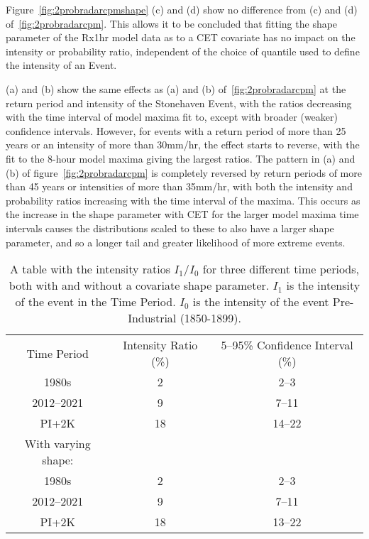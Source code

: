 Figure~\ref{fig:2probradarcpmshape} (c) and (d) show no difference from (c) and (d) of~\ref{fig:2probradarcpm}.
This allows it to be concluded that fitting the shape parameter of the Rx1hr model data as to a CET covariate has
    no impact on the intensity or probability ratio,
    independent of the choice of quantile used to define the intensity of an Event.

(a) and (b) show the same effects as (a) and (b) of~\ref{fig:2probradarcpm} at the return period and intensity
    of the Stonehaven Event,
    with the ratios decreasing with the time interval of model maxima fit to,
    except with broader (weaker) confidence intervals.
However,
    for events with a return period of more than 25 years or an intensity of more than 30mm/hr,
    the effect starts to reverse,
    with the fit to the 8-hour model maxima giving the largest ratios.
The pattern in (a) and (b) of figure~\ref{fig:2probradarcpm} is completely reversed by return periods of
    more than 45 years or intensities of more than 35mm/hr,
    with both the intensity and probability ratios increasing with the time interval of the maxima.
This occurs as the increase in the shape parameter with CET for the larger model maxima time intervals causes the
    distributions scaled to these to also have a larger shape parameter,
    and so a longer tail and greater likelihood of more extreme events.

\begin{table}[H]
   \centering
    \begin{tabular}{c c c}
        Time Period & Intensity Ratio (\%) & 5--95\% Confidence Interval (\%) \\
        1980s & 2 & 2--3 \\
        2012--2021 & 9 & 7--11 \\
        PI+2K & 18 & 14--22 \\
        With varying shape: && \\
        1980s & 2 & 2--3 \\
        2012--2021 & 9 & 7--11 \\
        PI+2K & 18 & 13--22 \\
    \end{tabular}
    \caption[A table with the intensity ratios.]{
        A table with the intensity ratios $I_1/I_0$ for three different time periods,
        both with and without a covariate shape parameter.
    $I_1$ is the intensity of the event in the Time Period.
    $I_0$ is the intensity of the event Pre-Industrial (1850-1899).}
    \label{tab:irtable}
\end{table}


